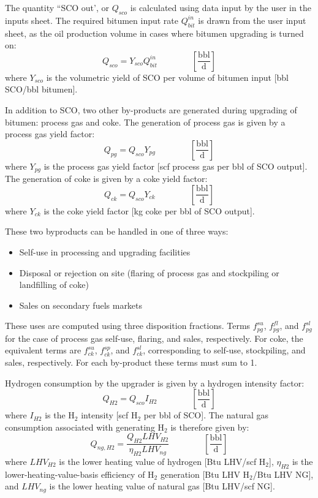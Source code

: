 \documentclass[11pt]{report}
\newcommand{\eqnunitfrac}[2]{\quad\quad \scriptstyle{\left[\frac{\text{#1}}{\text{#2}}\right]}}
\begin{document}
The quantity ``SCO out', or $Q_{sco}$ is calculated using data input by the user in the inputs sheet.  The required bitumen input rate $Q_{bit}^{in}$ is drawn from the user input sheet, as the oil production volume in cases where bitumen upgrading is turned on:
\begin{equation}
Q_{sco} = Y_{sco} Q_{bit}^{in} \quad\quad\eqnunitfrac{bbl}{d}
\end{equation}
where $Y_{sco}$ is the volumetric yield of SCO per volume of bitumen input [bbl SCO/bbl bitumen].

In addition to SCO, two other by-products are generated during upgrading of bitumen: process gas and coke.  The generation of process gas is given by a process gas yield factor:
\begin{equation}
Q_{pg} = Q_{sco}Y_{pg} \quad\quad\eqnunitfrac{bbl}{d}
\end{equation}
where $Y_{pg}$ is the process gas yield factor [scf process gas per bbl of SCO output]. The generation of coke is given by a coke yield factor:
\begin{equation}
Q_{ck} = Q_{sco}Y_{ck} \quad\quad\eqnunitfrac{bbl}{d}
\end{equation}
where $Y_{ck}$ is the coke yield factor [kg coke per bbl of SCO output]. 

These two byproducts can be handled in one of three ways:
\begin{itemize}
\item Self-use in processing and upgrading facilities
\item Disposal or rejection on site (flaring of process gas and stockpiling or landfilling of coke)
\item Sales on secondary fuels markets
\end{itemize}

These uses are computed using three disposition fractions. Terms $f_{pg}^{su}$, $f_{pg}^{fl}$, and $f_{pg}^{sl}$ for the case of process gas self-use, flaring, and sales, respectively. For coke, the equivalent terms are $f_{ck}^{su}$, $f_{ck}^{sp}$, and $f_{ck}^{sl}$, corresponding to self-use, stockpiling, and sales, respectively. For each by-product these terms must sum to 1.  

Hydrogen consumption by the upgrader is given by a hydrogen intensity factor:
\begin{equation}
Q_{H2} = Q_{sco}I_{H2} \quad\quad\eqnunitfrac{bbl}{d}
\end{equation}
where $I_{H2}$ is the H$_2$ intensity [scf H$_2$ per bbl of SCO].  The natural gas consumption associated with generating H$_2$ is therefore given by:
\begin{equation}
Q_{ng,H2} = \frac{Q_{H2} LHV_{H2}}{\eta_{H2} LHV_{ng}}\quad\quad\eqnunitfrac{bbl}{d}
\end{equation}
where $LHV_{H2}$ is the lower heating value of hydrogen [Btu LHV/scf H$_2$], $\eta_{H2}$ is the lower-heating-value-basis efficiency of H$_2$ generation [Btu LHV H$_2$/Btu LHV NG], and $LHV_{ng}$ is the lower heating value of natural gas [Btu LHV/scf NG].
\end{document}

